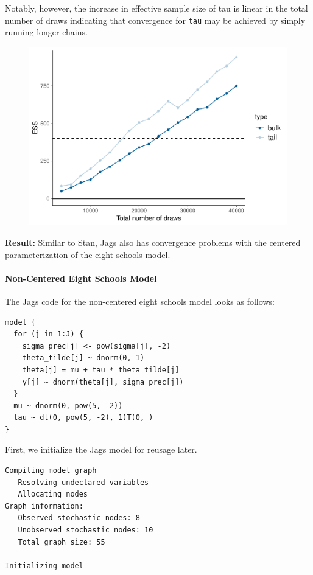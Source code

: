 \documentclass[american,]{article}
\let\oldparagraph\paragraph
\renewcommand{\paragraph}[1]{\oldparagraph{#1}\mbox{}}
\begin{document}
Notably, however, the increase in effective sample size of tau is linear
in the total number of draws indicating that convergence for
\texttt{tau} may be achieved by simply running longer chains.

\begin{figure}[tp]
  \centering
  \includegraphics[width=0.6\linewidth]{graphics/change-ess-jags-cp-tau-longer-1.pdf}
\end{figure}

\textbf{Result:} Similar to Stan, Jags also has convergence problems
with the centered parameterization of the eight schools model.

\hypertarget{non-centered-eight-schools-model-2}{%
\paragraph{Non-Centered Eight Schools
Model}\label{non-centered-eight-schools-model-2}}

The Jags code for the non-centered eight schools model looks as follows:

\begin{verbatim}
model {
  for (j in 1:J) {
    sigma_prec[j] <- pow(sigma[j], -2)
    theta_tilde[j] ~ dnorm(0, 1)
    theta[j] = mu + tau * theta_tilde[j]
    y[j] ~ dnorm(theta[j], sigma_prec[j])
  }
  mu ~ dnorm(0, pow(5, -2))
  tau ~ dt(0, pow(5, -2), 1)T(0, )
}
\end{verbatim}

First, we initialize the Jags model for reusage later.

\begin{verbatim}
Compiling model graph
   Resolving undeclared variables
   Allocating nodes
Graph information:
   Observed stochastic nodes: 8
   Unobserved stochastic nodes: 10
   Total graph size: 55

Initializing model
\end{verbatim}
\end{document}
